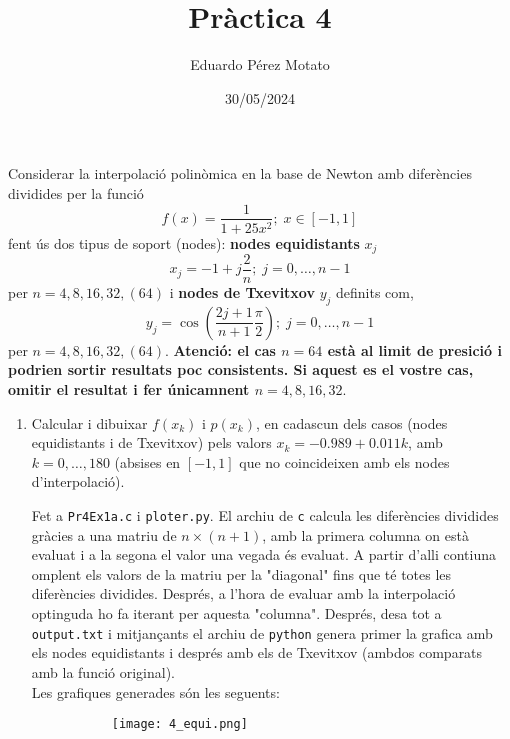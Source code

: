 \documentclass[a4paper, 12pt]{article}
\title{Pràctica 4}
\author{Eduardo Pérez Motato}
\date{30/05/2024}
\begin{document}
    \makeheader

    \begin{exercici}
        Considerar la interpolació polinòmica en la base de Newton amb diferències dividides per la funció
        $$
        f\left(x\right) = \frac{1}{1+25x^2};\; x\in \left[-1, 1\right]
        $$
        fent ús dos tipus de soport (nodes):
        \textbf{nodes equidistants} $x_j$
        $$
        x_j = -1 + j\frac{2}{n};\;j=0, \dots, n-1
        $$
        per $n = 4, 8, 16, 32, (64)$
        i \textbf{nodes de Txevitxov} $y_j$ definits com,
        $$
        y_j = \cos{\left(\frac{2j+1}{n+1}\frac{\pi}{2}\right)};\;j=0,\dots,n-1
        $$
        per $n = 4, 8, 16, 32, (64)$.
        \textbf{Atenció: el cas $n=64$ està al limit de presició i podrien sortir resultats poc
        consistents. Si aquest es el vostre cas, omitir el resultat i fer únicamnent $n = 4, 8, 16, 32.$}
        \begin{enumerate}[label=\alph*)]
            \item Calcular i dibuixar $f\left(x_k\right)$ i $p\left(x_k\right)$, en cadascun dels
            casos (nodes equidistants i de Txevitxov) pels valors $x_k = - 0.989 + 0.011k$, amb $k = 0, \dots, 180$
            (absises en $\left[-1, 1\right]$ que no coincideixen amb els nodes d'interpolació).\\
            \begin{solucio}
                Fet a \verb|Pr4Ex1a.c| i \verb|ploter.py|. El archiu de \verb|c| calcula les
                diferències dividides gràcies a una matriu de $n\times\left(n+1\right)$, amb la
                primera columna on està evaluat i a la segona el valor una vegada és evaluat. A partir
                d'alli contiuna omplent els valors de la matriu per la "diagonal" fins que té totes
                les diferències dividides. Després, a l'hora de evaluar amb la interpolació optinguda
                ho fa iterant per aquesta "columna". Després, desa tot a \verb|output.txt| i
                mitjançants el archiu de \verb|python| genera primer la grafica amb els nodes
                equidistants i després amb els de Txevitxov (ambdos comparats amb la funció original).\\
                Les grafiques generades són les seguents:
                \begin{figure}[H]
                    \begin{subfigure}{0.5\textwidth}
                        \centering
                        \texttt{[image: 4\_equi.png]}

\end{subfigure}
\end{figure}
\end{solucio}
\end{enumerate}
\end{exercici}
\end{document}
